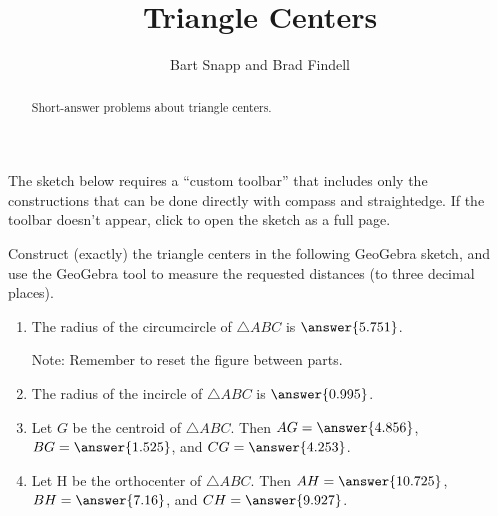 \documentclass[nooutcomes]{ximera}
\title{Triangle Centers}
\author{Bart Snapp and Brad Findell}
\begin{document}
\begin{abstract}
Short-answer problems about triangle centers. 
\end{abstract}
\maketitle


\begin{warning}
The sketch below requires a ``custom toolbar'' that includes only the constructions that can be done directly with compass and straightedge.  If the toolbar doesn't appear, click 
 to open the sketch as a full page.
\end{warning}

\begin{problem}
Construct (exactly) the triangle centers in the following 
GeoGebra sketch, and use the GeoGebra tool to measure the requested distances (to three decimal places). 
\begin{center}  
\end{center}
%
\begin{enumerate}
\item The radius of the circumcircle of $\triangle ABC$ is 
$\answer{5.751}$.  

Note: Remember to reset the figure between parts.   

\item The radius of the incircle of $\triangle ABC$ is 
$\answer{0.995}$.  

\item Let $G$ be the centroid of $\triangle ABC$.  
Then $AG = \answer{4.856}$, $BG = \answer{1.525}$, 
and $CG = \answer{4.253}$.  

\item Let H be the orthocenter of $\triangle ABC$. 
Then $AH = \answer{10.725}$, $BH = \answer{7.16}$, 
and $CH = \answer{9.927}$. 
\end{enumerate}

\end{problem}
\end{document}
